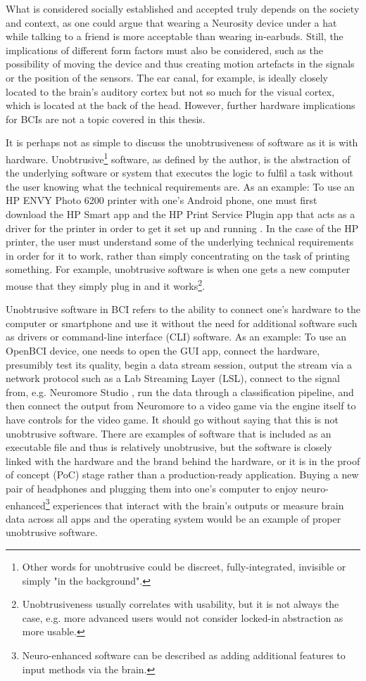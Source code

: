 What is considered socially established and accepted truly depends on the society and context, as one could argue that wearing a Neurosity device under a hat while talking to a friend is more acceptable than wearing in-earbuds. Still, the implications of different form factors must also be considered, such as the possibility of moving the device and thus creating motion artefacts in the signals or the position of the sensors. The ear canal, for example, is ideally closely located to the brain's auditory cortex but not so much for the visual cortex, which is located at the back of the head. However, further hardware implications for BCIs are not a topic covered in this thesis.

It is perhaps not as simple to discuss the unobtrusiveness of software as it is with hardware. Unobtrusive\footnote{Other words for unobtrusive could be discreet, fully-integrated, invisible or simply "in the background".} software, as defined by the author, is the abstraction of the underlying software or system that executes the logic to fulfil a task without the user knowing what the technical requirements are. As an example: To use an HP ENVY Photo 6200 printer with one's Android phone, one must first download the HP Smart app and the HP Print Service Plugin app that acts as a driver for the printer in order to get it set up and running \citep{hp_hp_nodate}. In the case of the HP printer, the user must understand some of the underlying technical requirements in order for it to work, rather than simply concentrating on the task of printing something. For example, unobtrusive software is when one gets a new computer mouse that they simply plug in and it works\footnote{Unobtrusiveness usually correlates with usability, but it is not always the case, e.g. more advanced users would not consider locked-in abstraction as more usable.}.

Unobtrusive software in BCI refers to the ability to connect one's hardware to the computer or smartphone and use it without the need for additional software such as drivers or command-line interface (CLI) software. As an example: To use an OpenBCI device, one needs to open the GUI app, connect the hardware, presumibly test its quality, begin a data stream session, output the stream via a network protocol such as a Lab Streaming Layer (LSL), connect to the signal from, e.g. Neuromore Studio \citep{openbci_neuromore_nodate}, run the data through a classification pipeline, and then connect the output from Neuromore to a video game via the engine itself to have controls for the video game. It should go without saying that this is not unobtrusive software. There are examples of software that is included as an executable file and thus is relatively unobtrusive, but the software is closely linked with the hardware and the brand behind the hardware, or it is in the proof of concept (PoC) stage rather than a production-ready application. Buying a new pair of headphones and plugging them into one's computer to enjoy neuro-enhanced\footnote{Neuro-enhanced software can be described as adding additional features to input methods via the brain.} experiences that interact with the brain's outputs or measure brain data across all apps and the operating system would be an example of proper unobtrusive software.

